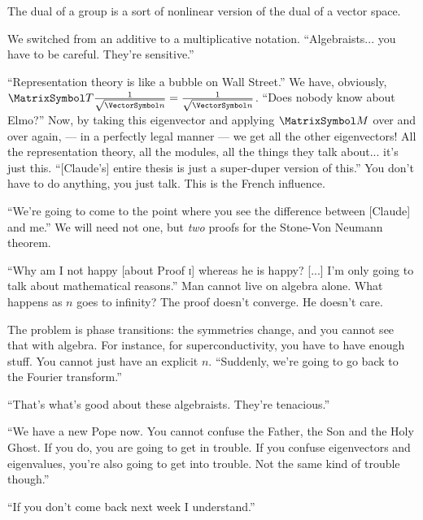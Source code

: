 \documentclass[10pt, a4paper, twoside]{lecturenotes}
\begin{document}
\begin{lecture}[date=2013-03-21, official=true]
\begingroup
\newcommand{\vsqrtninv}{\frac{1}{\sqrt{\vn}}}
The dual of a group is a sort of nonlinear version of the dual of a vector space.

We switched from an additive to a multiplicative notation. ``Algebraists... you have to be careful. They're sensitive.''

``Representation theory is like a bubble on Wall Street.'' We have, obviously, $\matT  \vsqrtninv = \vsqrtninv$. ``Does nobody know about Elmo?''  Now, by taking this eigenvector and applying $\matM$ over and over again, --- in a perfectly legal manner --- we get all the other eigenvectors! All the representation theory, all the modules, all the things they talk about... it's just this. ``[Claude's] entire thesis is just a super-duper version of this.'' You don't have to do anything, you just talk. This is the French influence.

``We're going to come to the point where you see the difference between [Claude] and me.'' We will need not one, but \emph{two} proofs for the Stone-Von Neumann theorem.

``Why am I not happy [about Proof \textsc{i}] whereas he is happy? [...] I'm only going to talk about mathematical reasons.'' Man cannot live on algebra alone. What happens as $n$ goes to infinity? The proof doesn't converge. He doesn't care. 

The problem is phase transitions: the symmetries change, and you cannot see that with algebra. For instance, for superconductivity, you have to have enough stuff. You cannot just have an explicit $n$. 
``Suddenly, we're going to go back to the Fourier transform.'' 

\noindent
``That's what's good about these algebraists. They're tenacious.''

``We have a new Pope now. You cannot confuse the Father, the Son and the Holy Ghost. If you do, you are going to get in trouble. If you confuse eigenvectors and eigenvalues, you're also going to get into trouble. Not the same kind of trouble though.''

``If you don't come back next week I understand.''
\endgroup
\end{lecture}
\end{document}
